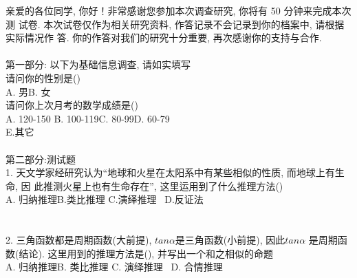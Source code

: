 亲爱的各位同学, 你好！非常感谢您参加本次调查研究, 你将有 50 分钟来完成本次测
试卷. 本次试卷仅作为相关研究资料, 作答记录不会记录到你的档案中, 请根据实际情况作
答. 你的作答对我们的研究十分重要, 再次感谢你的支持与合作.\\
\\
第一部分: 以下为基础信息调查, 请如实填写\\
请问你的性别是(\quad )\\
A. 男\qquad  \qquad \qquad B. 女\\
请问你上次月考的数学成绩是(\quad  )\\
A. 120-150 \qquad  \qquad \qquad B. 100-119\qquad \qquad \qquad C. 80-99\qquad \qquad \qquad D. 60-79  \\
E.其它\\
\\
第二部分:测试题\\
1. 天文学家经研究认为“地球和火星在太阳系中有某些相似的性质, 而地球上有生命, 因
此推测火星上也有生命存在”, 这里运用到了什么推理方法(\quad )\\
A. 归纳推理\qquad  \qquad \quad B.类比推理 \; \quad  \quad \qquad C.演绎推理 \ \quad  \quad \qquad D.反证法\\
\\
\\
2. 三角函数都是周期函数(大前提), $tan\alpha$是三角函数(小前提), 因此$tan\alpha$ 是周期函数(结论). 这里用到的推理方法是(\quad  ), 并写出一个和之相似的命题\\
A. 归纳推理\qquad  \qquad \quad B. 类比推理 \; \quad  \quad \qquad C. 演绎推理 \ \quad  \quad \qquad D. 合情推理\\
\\
\\
 
 
 
 \newpage
